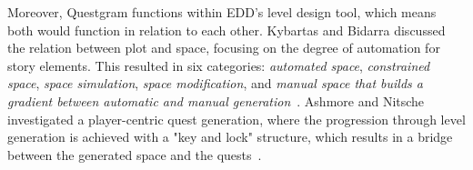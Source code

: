 









Moreover, Questgram functions within EDD's level design tool, which means both would function in relation to each other. Kybartas and Bidarra discussed the relation between plot and space, focusing on the degree of automation for story elements. This resulted in six categories: \emph{automated space}, \emph{constrained space}, \emph{space simulation}, \emph{space modification}, and \emph{manual space that builds a gradient between automatic and manual generation}~\cite{p8kybartas2016survey}. Ashmore and Nitsche investigated a player-centric quest generation, where the progression through level generation is achieved with a "key and lock" structure, which results in a bridge between the generated space and the quests~\cite{p8ashmore2007-questGeneratedWorld}.

